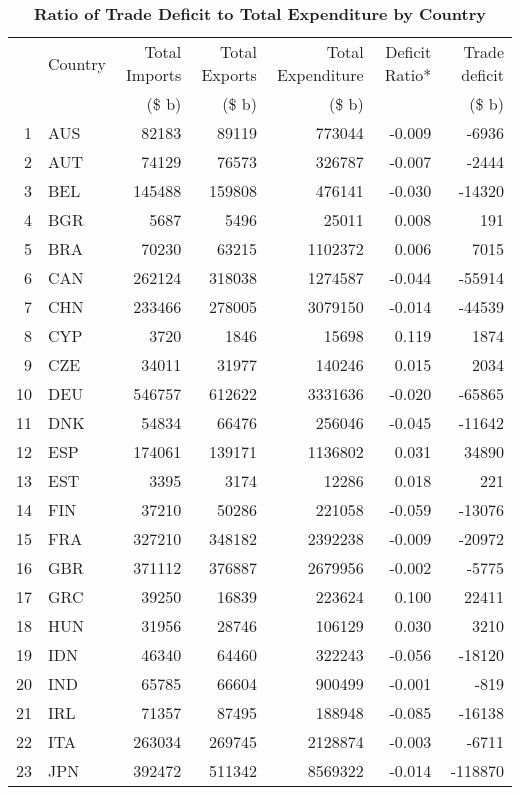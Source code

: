 \documentclass[12pt]{article}
\begin{document}
\begin{table}[!htbp]
\caption{\textbf{Ratio of Trade Deficit to Total Expenditure by Country}}
\centering
\begin{tabular}{rlrrrrr}
  \hline
 & Country & Total Imports & Total Exports & Total Expenditure & Deficit Ratio* & Trade deficit \\ 
  & & (\$ b) & (\$ b) & (\$ b) &  & (\$ b) \\ 
  \hline
1 & AUS & 82183 & 89119 & 773044 & -0.009 & -6936 \\ 
  2 & AUT & 74129 & 76573 & 326787 & -0.007 & -2444 \\ 
  3 & BEL & 145488 & 159808 & 476141 & -0.030 & -14320 \\ 
  4 & BGR & 5687 & 5496 & 25011 & 0.008 & 191 \\ 
  5 & BRA & 70230 & 63215 & 1102372 & 0.006 & 7015 \\ 
  6 & CAN & 262124 & 318038 & 1274587 & -0.044 & -55914 \\ 
  7 & CHN & 233466 & 278005 & 3079150 & -0.014 & -44539 \\ 
  8 & CYP & 3720 & 1846 & 15698 & 0.119 & 1874 \\ 
  9 & CZE & 34011 & 31977 & 140246 & 0.015 & 2034 \\ 
  10 & DEU & 546757 & 612622 & 3331636 & -0.020 & -65865 \\ 
  11 & DNK & 54834 & 66476 & 256046 & -0.045 & -11642 \\ 
  12 & ESP & 174061 & 139171 & 1136802 & 0.031 & 34890 \\ 
  13 & EST & 3395 & 3174 & 12286 & 0.018 & 221 \\ 
  14 & FIN & 37210 & 50286 & 221058 & -0.059 & -13076 \\ 
  15 & FRA & 327210 & 348182 & 2392238 & -0.009 & -20972 \\ 
  16 & GBR & 371112 & 376887 & 2679956 & -0.002 & -5775 \\ 
  17 & GRC & 39250 & 16839 & 223624 & 0.100 & 22411 \\ 
  18 & HUN & 31956 & 28746 & 106129 & 0.030 & 3210 \\ 
  19 & IDN & 46340 & 64460 & 322243 & -0.056 & -18120 \\ 
  20 & IND & 65785 & 66604 & 900499 & -0.001 & -819 \\ 
  21 & IRL & 71357 & 87495 & 188948 & -0.085 & -16138 \\ 
  22 & ITA & 263034 & 269745 & 2128874 & -0.003 & -6711 \\ 
  23 & JPN & 392472 & 511342 & 8569322 & -0.014 & -118870 \\ 

\end{tabular}
\end{table}
\end{document}
